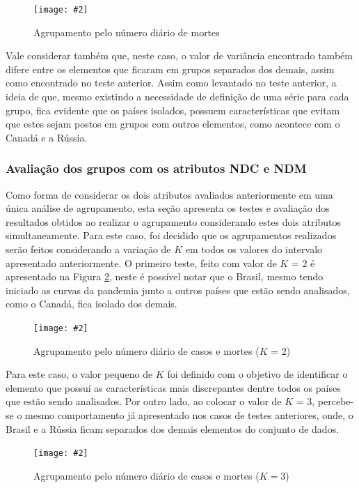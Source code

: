 \documentclass[a4paper,12pt]{article}
\newcommand{\image}[4]{
    \begin{figure}[H]%
        \begin{center}
        \caption{#3}
        \texttt{[image: \#2]}
        \label{#4}
        \end{center}
    \end{figure}
}
\begin{document}
\image{0.9}{images/analise_de_agrupamento/1_grupos_k3_ndm.png}{Agrupamento pelo número diário de mortes}{figure:group_ndm}

\par Vale considerar também que, neste caso, o valor de variância encontrado também difere entre os elementos que ficaram em grupos separados dos demais, assim como encontrado no teste anterior. Assim como levantado no teste anterior, a ideia de que, mesmo existindo a necessidade de definição de uma série para cada grupo, fica evidente que os países isolados, possuem características que evitam que estes sejam postos em grupos com outros elementos, como acontece com o Canadá e a Rússia.

\subsubsection{Avaliação dos grupos com os atributos NDC e NDM}

\par Como forma de considerar os dois atributos avaliados anteriormente em uma única análise de agrupamento, esta seção apresenta os testes e avaliação dos resultados obtidos ao realizar o agrupamento considerando estes dois atributos simultaneamente. Para este caso, foi decidido que os agrupamentos realizados serão feitos considerando a variação de $K$ em todos os valores do intervalo apresentado anteriormente. O primeiro teste, feito com valor de $K$ = 2  é apresentado na Figura \ref{figure:group_ndcndm1}, neste é possível notar que o Brasil, mesmo tendo iniciado as curvas da pandemia junto a outros países que estão sendo analisados, como o Canadá, fica isolado dos demais.

\image{0.9}{images/analise_de_agrupamento/2_grupos_k2_ndc-e-ndm.png}{Agrupamento pelo número diário de casos e mortes ($K$ = 2)}{figure:group_ndcndm1}

\par Para este caso, o valor pequeno de $K$ foi definido com o objetivo de identificar o elemento que possuí as características mais discrepantes dentre todos os países que estão sendo analisados. Por outro lado, ao colocar o valor de $K$ = 3, percebe-se o mesmo comportamento já apresentado nos casos de testes anteriores, onde, o Brasil e a Rússia ficam separados dos demais elementos do conjunto de dados.

\image{0.9}{images/analise_de_agrupamento/2_grupos_k3_ndc-e-ndm.png}{Agrupamento pelo número diário de casos e mortes ($K = 3$)}{figure:group_ndcndm2}
\end{document}
